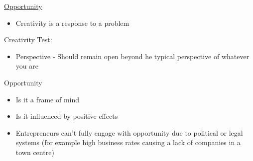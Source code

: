 \documentclass{article}[18pt]
\begin{document}
\begin{center}
\underline{\huge Opportunity}
\end{center}
\begin{itemize}
\item Creativity is a response to a problem
\end{itemize}
Creativity Test:
\begin{itemize}
\item Perspective - Should remain open beyond he typical perspective of whatever you are
\end{itemize}
Opportunity
\begin{itemize}
\item Is it a frame of mind
\item Is it influenced by positive effects
\item Entrepreneurs can't fully engage with opportunity due to political or legal systems (for example high business rates causing a lack of companies in a town centre)
\end{itemize}
\end{document}
